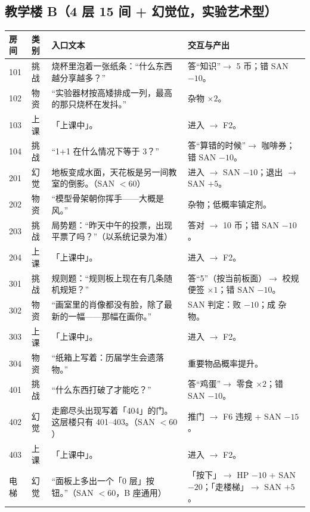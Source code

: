 \documentclass[UTF8, fontset=none, 11pt]{ctexart}
\begin{document}
\subsection{教学楼 B（4 层 15 间 + 幻觉位，实验艺术型）}
\begin{longtable}{p{1.1cm}p{1.2cm}p{6.6cm}p{5.5cm}}
\toprule
房间 & 类别 & 入口文本 & 交互与产出 \\
\midrule
\endhead
101 & 挑战 & 烧杯里泡着一张纸条：``什么东西越分享越多？'' & 答``知识''$\to$ 5 币；错 SAN $-10$。 \\
102 & 物资 & ``实验器材按高矮排成一列，最高的那只烧杯在发抖。'' & 杂物 $\times 2$。 \\
103 & 上课 & 「上课中」。 & 进入 $\to$ F2。 \\
104 & 挑战 & ``1+1 在什么情况下等于 3？'' & 答``算错的时候''$\to$ 咖啡券；错 SAN $-10$。 \\
201 & 幻觉 & 地板变成水面，天花板是另一间教室的倒影。（SAN $<60$） & 进入 $\to$ SAN $-10$；退出 $\to$ SAN $+5$。 \\
202 & 物资 & ``模型骨架朝你挥手——大概是风。'' & 杂物；低概率镇定剂。 \\
203 & 挑战 & 局势题：``昨天中午的投票，出现平票了吗？''（以系统记录为准） & 答对 $\to$ 10 币；错 SAN $-10$。 \\
204 & 上课 & 「上课中」。 & 进入 $\to$ F2。 \\
301 & 挑战 & 规则题：``规则板上现在有几条随机规矩？'' & 答``5''（按当前板面）$\to$ 校规便签 $\times 1$；错 SAN $-10$。 \\
302 & 物资 & ``画室里的肖像都没有脸，除了最新的一幅——那幅在画你。'' & SAN 判定：败 $-10$；成 杂物。 \\
303 & 上课 & 「上课中」。 & 进入 $\to$ F2。 \\
304 & 物资 & ``纸箱上写着：历届学生会遗落物。'' & 重要物品概率提升。 \\
401 & 挑战 & ``什么东西打破了才能吃？'' & 答``鸡蛋''$\to$ 零食 $\times 2$；错 SAN $-10$。 \\
402 & 幻觉 & 走廊尽头出现写着「404」的门。这层楼只有 401--403。（SAN $<60$） & 推门 $\to$ F6 违规 + SAN $-15$。 \\
403 & 上课 & 「上课中」。 & 进入 $\to$ F2。 \\
电梯 & 幻觉 & ``面板上多出一个「0 层」按钮。''（SAN $<60$，B 座通用） & 「按下」$\to$ HP $-10$ + SAN $-20$；「走楼梯」$\to$ SAN $+5$。 \\
\bottomrule
\end{longtable}
\end{document}
